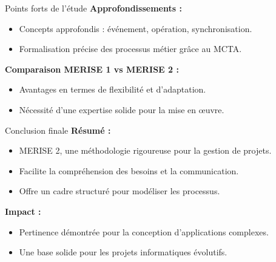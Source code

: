 \documentclass{beamer}
\begin{document}
\begin{frame}{Points forts de l'étude}
    \textbf{Approfondissements :}
    \begin{itemize}
        \item Concepts approfondis : événement, opération, synchronisation.
        \item Formalisation précise des processus métier grâce au MCTA.
    \end{itemize}
    \vspace{0.5cm}
    \textbf{Comparaison MERISE 1 vs MERISE 2 :}
    \begin{itemize}
        \item Avantages en termes de flexibilité et d'adaptation.
        \item Nécessité d'une expertise solide pour la mise en œuvre.
    \end{itemize}
\end{frame}

\begin{frame}{Conclusion finale}
    \textbf{Résumé :}
    \begin{itemize}
        \item MERISE 2, une méthodologie rigoureuse pour la gestion de projets.
        \item Facilite la compréhension des besoins et la communication.
        \item Offre un cadre structuré pour modéliser les processus.
    \end{itemize}
    \vspace{0.5cm}
    \textbf{Impact :}
    \begin{itemize}
        \item Pertinence démontrée pour la conception d'applications complexes.
        \item Une base solide pour les projets informatiques évolutifs.
    \end{itemize}
\end{frame}
\end{document}
